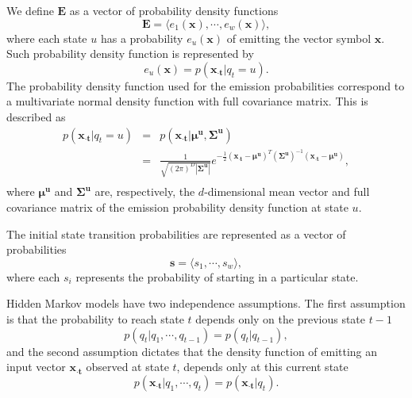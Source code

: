 We define $\mathbf{E}$ as a vector of probability density functions
\begin{equation}
  \label{eq:hmm.e}
  \mathbf{E} = \langle e_1(\mathbf{x}), \cdots, e_{w}(\mathbf{x}) \rangle,
\end{equation}
where each state $u$ has a probability $e_u(\mathbf{x})$ of emitting the vector symbol $ \mathbf{x} $. Such probability density function is represented by
\begin{equation}
  \label{eq:hmm.emission}
  e_u(\mathbf{x}) = p( \mathbf{{x}_{\cdot t}} | q_t = u).
\end{equation}
The probability density function used for the emission probabilities correspond to a multivariate normal density function with full covariance matrix. This is described as
\begin{equation}
  \label{eq:hmm.emission.gaussian}
  \begin{array}{lcl}
    p(\mathbf{{x}_{\cdot t}} | q_t = u) & = & 
    p(\mathbf{x_{\cdot t}}|{{\boldsymbol\mu}^{\mathbf{u}}},{{\boldsymbol\Sigma}^{\mathbf{u}}})\\[0.4em] & = &
    \frac{1}{ \sqrt{(2\pi)^{D} {| {{\boldsymbol\Sigma}^{\mathbf{u}}} |}}}
    e^{-\frac{1}{2} (\mathbf{x_{\cdot t}}-{{\boldsymbol\mu}^{\mathbf{u}}})^T ({{\boldsymbol\Sigma}^{\mathbf{u}}})^{-1} (\mathbf{x_{\cdot t}}-{{\boldsymbol\mu}^{\mathbf{u}}})}, \\
  \end{array}
\end{equation}
where ${{\boldsymbol\mu}^{\mathbf{u}}}$ and ${{\boldsymbol\Sigma}^{\mathbf{u}}}$ are, respectively, the $d$-dimensional mean vector and full covariance matrix of the emission probability density function at state $u$.

The initial state transition probabilities are represented as a vector of probabilities
\begin{equation}
  \label{eq:hmm.initial}
  \mathbf{s} = \langle s_{1}, \cdots, s_{w} \rangle,
\end{equation}
where each $s_i$ represents the probability of starting in a particular state.

Hidden Markov models have two independence assumptions. The first assumption is that the probability to reach state $t$ depends only on the previous state $t-1$
\begin{equation}
  \label{eq:hmm.indep.1}
  p(q_t | q_1, \cdots, q_{t-1}) = p(q_t | q_{t-1}),
\end{equation}
and the second assumption dictates that the density function of emitting an input vector $\mathbf{{x}_{\cdot t}}$ observed at state $t$, depends only at this current state
\begin{equation}
  \label{eq:hmm.indep.2}
  p(\mathbf{{x}_{\cdot t}} | q_1, \cdots, q_t) = p(\mathbf{{x}_{\cdot t}} | q_t).
\end{equation}

